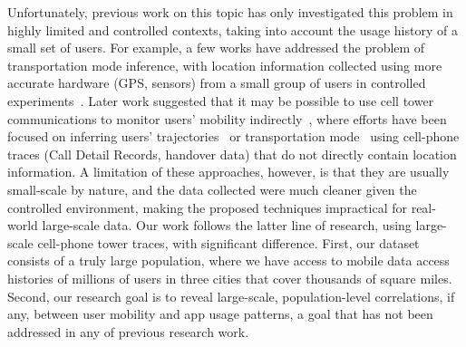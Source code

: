 
Unfortunately, previous work on this topic has only investigated this problem in highly limited and controlled contexts,
taking into account the usage history of a small set of users.
For example, a few works have addressed the problem of transportation mode inference,
with location information collected using more accurate 
hardware (\eg GPS, sensors) %
from a small group of users in controlled experiments~\cite{ohashi2014automatic, ryder2009ambulation, zheng2010understanding, biljecki2013transportation, stenneth2011transportation, waga2012detecting, widhalm2012transport, Reddy:2010:UMP:1689239.1689243}.
Later work suggested that it may be possible to use cell tower communications to monitor users' mobility indirectly~\cite{rose2006mobile},
where efforts have been focused on inferring users' trajectories~\cite{Alsolami2012Auth,jiang2013review}
or transportation mode~\cite{wang2010transportation,bekhor2015investigation} using cell-phone traces
(\eg Call Detail Records, handover data) that do not directly contain location information. 
A limitation of these approaches, however, is that they are usually small-scale by nature, and the 
data collected were much cleaner 
given the controlled environment, making the proposed techniques impractical  for real-world large-scale data. 
Our work follows the latter line of research, using large-scale cell-phone tower traces, with significant difference. 
First, our dataset consists of a truly large population,
where we have access to mobile data access histories of millions of users in three cities that cover thousands of square miles.
Second, %
our research goal is to reveal large-scale, population-level correlations,
if any, between user mobility and app usage patterns,
a goal that has not been addressed in any of previous research work.

